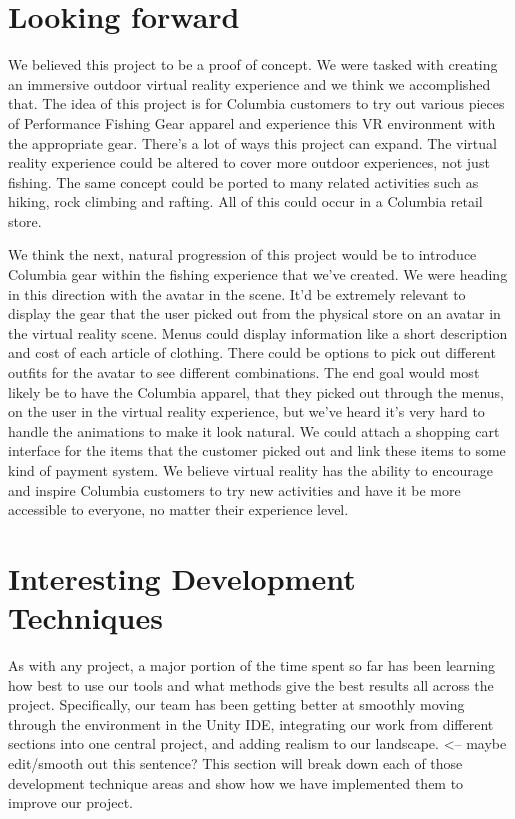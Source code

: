 \documentclass[10pt,journal,compsoc,onecolumn, draftclsnofoot]{IEEEtran}
\begin{document}
\section{Looking forward}
We believed this project to be a proof of concept.
We were tasked with creating an immersive outdoor virtual reality experience and we think we accomplished that.
The idea of this project is for Columbia customers to try out various pieces of Performance Fishing Gear apparel and experience this VR environment with the appropriate gear.
There's a lot of ways this project can expand. The virtual reality experience could be altered to cover more outdoor experiences, not just fishing.
The same concept could be ported to many related activities such as hiking, rock climbing and rafting.
All of this could occur in a Columbia retail store.

We think the next, natural progression of this project would be to introduce Columbia gear within the fishing experience that we've created.
We were heading in this direction with the avatar in the scene.
It'd be extremely relevant to display the gear that the user picked out from the physical store on an avatar in the virtual reality scene.
Menus could display information like a short description and cost of each article of clothing.
There could be options to pick out different outfits for the avatar to see different combinations.
The end goal would most likely be to have the Columbia apparel, that they picked out through the menus, on the user in the virtual reality experience, but we've heard it's very hard to handle the animations to make it look natural.
We could attach a shopping cart interface for the items that the customer picked out and link these items to some kind of payment system.
We believe virtual reality has the ability to encourage and inspire Columbia customers to try new activities and have it be more accessible to everyone, no matter their experience level.

\section{Interesting Development Techniques}
As with any project, a major portion of the time spent so far has been learning how best to use our tools and what methods give the best results all across the project.
Specifically, our team has been getting better at smoothly moving through the environment in the Unity IDE, integrating our work from different sections into one central project, and adding realism to our landscape.  <-- maybe edit/smooth out this sentence?
This section will break down each of those development technique areas and show how we have implemented them to improve our project.
\end{document}
